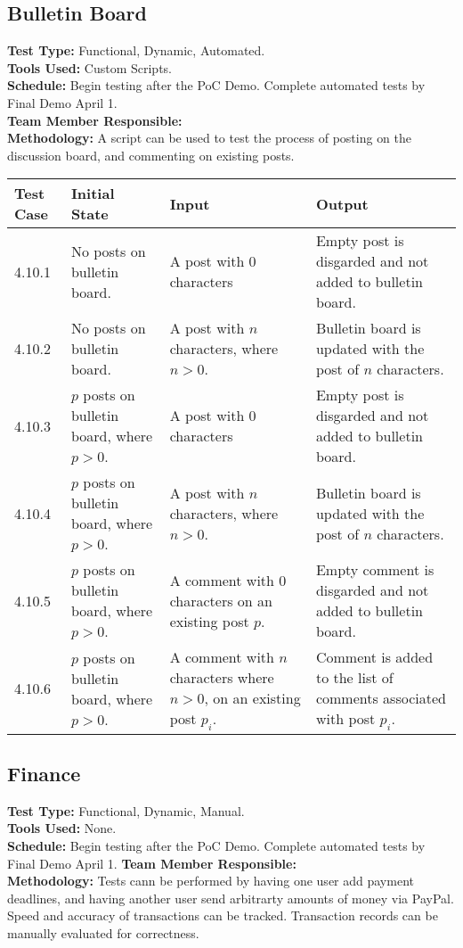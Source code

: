 \documentclass[12pt]{article}
\begin{document}
\subsection{Bulletin Board}
\textbf{Test Type:} Functional, Dynamic, Automated. \\
\textbf{Tools Used:} Custom Scripts. \\
\textbf{Schedule:} Begin testing after the PoC Demo. Complete automated tests by Final Demo April 1. \\
\textbf{Team Member Responsible:} \\
\textbf{Methodology:} A script can be used to test the process of posting on the discussion board, and commenting on existing posts.

\begin{longtable}{|p{2cm}|p{3cm}|p{5cm}|p{5cm}|}
\hline
\textbf{Test Case} & \textbf{Initial State} & \textbf{Input} & \textbf{Output} \\ \hline
4.10.1 & No posts on bulletin board. & A post with 0 characters & Empty post is disgarded and not added to bulletin board.\\
\hline
4.10.2 & No posts on bulletin board. & A post with $n$ characters, where $n > 0$. & Bulletin board is updated with the post of $n$ characters.\\
\hline
4.10.3 & $p$ posts on bulletin board, where $p > 0$. & A post with 0 characters & Empty post is disgarded and not added to bulletin board.\\
\hline
4.10.4 & $p$ posts on bulletin board, where $p > 0$. & A post with $n$ characters, where $n > 0$. & Bulletin board is updated with the post of $n$ characters.\\
\hline
4.10.5 & $p$ posts on bulletin board, where $p > 0$. & A comment with 0 characters on an existing post $p$. & Empty comment is disgarded and not added to bulletin board.\\
\hline
4.10.6 & $p$ posts on bulletin board, where $p > 0$. & A comment with $n$ characters where $n > 0$, on an existing post $p_i$. & Comment is added to the list of comments associated with post $p_i$.\\
\hline
\end{longtable}
  
\subsection{Finance}
\textbf{Test Type:} Functional, Dynamic, Manual. \\
\textbf{Tools Used:} None. \\
\textbf{Schedule:} Begin testing after the PoC Demo. Complete automated tests by Final Demo April 1.
\textbf{Team Member Responsible:} \\
\textbf{Methodology:} Tests cann be performed by having one user add payment deadlines, and having another user send arbitrarty amounts of money via PayPal. Speed and accuracy of transactions can be tracked. Transaction records can be manually evaluated for correctness.
\end{document}
